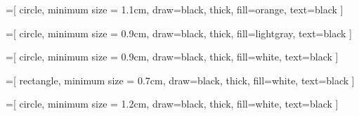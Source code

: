 
\usepackage{tikz}

\usetikzlibrary{graphs}
\usetikzlibrary{shapes}
\usetikzlibrary{arrows.meta,arrows}

%
%

\newcommand{\drawinvisiblegraphline}{
    \draw [color=white]}

\newcommand{\drawgraphlinebigarrow}{
    \draw [-{Stealth[length=2mm,width=2mm]}]}

\newcommand{\drawgraphdashedlinebigarrow}{
    \draw [-{Stealth[length=2mm,width=2mm]},dashed]}


=[
    circle,
    minimum size = 1.1cm,
    draw=black,
    thick,
    fill=orange,
    text=black
]

=[
    circle,
    minimum size = 0.9cm,
    draw=black,
    thick,
    fill=lightgray,
    text=black
]


=[
    circle,
    minimum size = 0.9cm,
    draw=black,
    thick,
    fill=white,
    text=black
]

=[
    rectangle,
    minimum size = 0.7cm,
    draw=black,
    thick,
    fill=white,
    text=black
]

=[
    circle,
    minimum size = 1.2cm,
    draw=black,
    thick,
    fill=white,
    text=black
]
